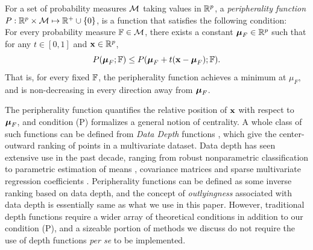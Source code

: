 \begin{Definition}\label{defn:peripherality}
For a set of probability measures $\mathcal{M}$ taking values in ${\mathbb{R}}^p$, a {\it peripherality function} $ P : {\mathbb{R}}^p \times \mathcal{M} \mapsto {\mathbb{R}}^+ \cup \{ 0\}$,  is a function that satisfies the following condition:\\

 For every probability measure ${\mathbb{F}} \in \mathcal{M}$, there exists a constant ${\boldsymbol{\mu}}_{F} \in {\mathbb{R}}^p$ such that for any $t \in [ 0, 1]$ and ${\bf{x}} \in {\mathbb{R}}^p$,
%
$$ 
P ( {\boldsymbol{\mu}}_{F} ; {\mathbb{F}} ) \leq P ( {\boldsymbol{\mu}}_{F} + t ( {\bf{x}} - {\boldsymbol{\mu}}_{F} ); {\mathbb{F}} ). 
$$ 
%
That is, for every fixed ${\mathbb{F}}$, the peripherality function achieves a minimum at $\mu_{F}$, and is non-decreasing in every direction away from ${\boldsymbol{\mu}}_{F}$.
\end{Definition}

The peripherality function quantifies the relative position of ${\bf{x}}$ with respect to ${\boldsymbol{\mu}}_{F}$, and condition (P) formalizes a general notion of centrality. A whole class of such functions can be defined from {\it Data Depth} functions \citep{zuo00}, which give the center-outward ranking of points in a multivariate dataset. Data depth has seen extensive use in the past decade, ranging from robust nonparametric classification \citep{jornsten04, ghosh05, dutta12, sguera14} to parametric estimation of means \citep{ZuoCuiHe04}, covariance matrices \citep{ZuoCui05} and sparse multivariate regression coefficients \citep{DuttaGenton17,MajumdarChatterjeeStat}. Peripherality functions can be defined as some inverse ranking based on data depth, and the concept of {\it outlyingness} associated with data depth is essentially same as what we use in this paper. However, traditional depth functions require a wider array of theoretical conditions \citep{zuo00} in addition to our condition (P), and a sizeable portion of methods we discuss do not require the use of depth functions {\it per se} to be implemented. %


